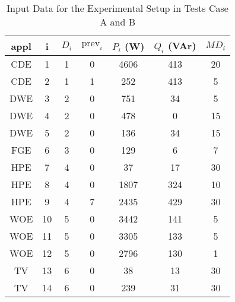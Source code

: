 \begin{table}[tb]
\centering
\caption{Input Data for the Experimental Setup in Tests Case A and B}
\label{statesS2}
\begin{tabular}{ccccccc}
\hline
\textbf{appl} & \textbf{i} & \textbf{$D_i$} & \textbf{$\text{prev}_i$} & \textbf{$P_i$} (W) & \textbf{$Q_i$ (VAr)} & \textbf{$MD_i$} \\
\hline
    CDE            &    1              & 1            & 0            & 4606    & 413      & 20               \\
    CDE            &    2              & 1            & 1            & 252     & 413      & 5                \\
    DWE            &    3              & 2            & 0            & 751     & 34       & 5                \\
    DWE            &    4              & 2            & 0            & 478     & 0        & 15               \\
    DWE            &    5              & 2            & 0            & 136     & 34       & 15               \\
    FGE            &    6              & 3            & 0            & 129     & 6        &  7               \\
    HPE            &    7              & 4            & 0            & 37      & 17       & 30               \\
    HPE            &    8              & 4            & 0            & 1807    & 324      & 10               \\
    HPE            &    9              & 4            & 7            & 2435    & 429      & 30               \\
    WOE            &	10		 	   & 5			  & 0			 & 3442	   & 141      &  5               \\
    WOE            &	11		 	   & 5			  & 0		 	 & 3305	   & 133      &  5               \\
    WOE            &	12		 	   & 5    		  & 0		     & 2796	   & 130      &  1				 \\
    TV             &    13             & 6            & 0            & 38      & 13       & 30               \\
    TV             &    14             & 6            & 0           & 239     & 31       & 30              \\
\hline
\end{tabular}
\end{table}

